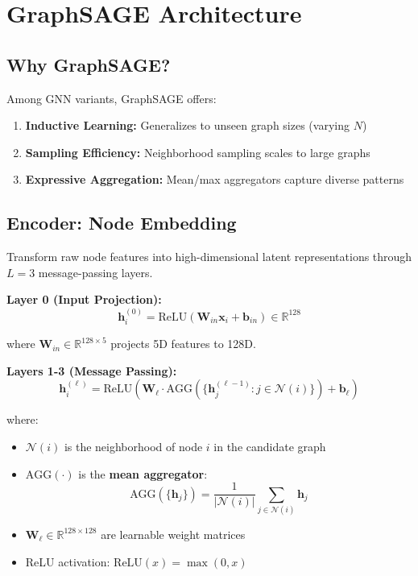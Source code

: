 \section{GraphSAGE Architecture}

\subsection{Why GraphSAGE?}

Among GNN variants, GraphSAGE offers:
\begin{enumerate}
    \item \textbf{Inductive Learning:} Generalizes to unseen graph sizes (varying $N$)
    \item \textbf{Sampling Efficiency:} Neighborhood sampling scales to large graphs
    \item \textbf{Expressive Aggregation:} Mean/max aggregators capture diverse patterns
\end{enumerate}

\subsection{Encoder: Node Embedding}

Transform raw node features into high-dimensional latent representations through $L=3$ message-passing layers.

\textbf{Layer 0 (Input Projection):}
\begin{equation}
\mathbf{h}_i^{(0)} = \text{ReLU}\left( \mathbf{W}_{in} \mathbf{x}_i + \mathbf{b}_{in} \right) \in \mathbb{R}^{128}
\end{equation}

where $\mathbf{W}_{in} \in \mathbb{R}^{128 \times 5}$ projects 5D features to 128D.

\textbf{Layers 1-3 (Message Passing):}
\begin{equation}
\mathbf{h}_i^{(\ell)} = \text{ReLU}\left( \mathbf{W}_{\ell} \cdot \text{AGG}\left( \{\mathbf{h}_j^{(\ell-1)} : j \in \mathcal{N}(i)\} \right) + \mathbf{b}_{\ell} \right)
\end{equation}

where:
\begin{itemize}
    \item $\mathcal{N}(i)$ is the neighborhood of node $i$ in the candidate graph
    \item $\text{AGG}(\cdot)$ is the \textbf{mean aggregator}:
    \begin{equation}
    \text{AGG}(\{\mathbf{h}_j\}) = \frac{1}{|\mathcal{N}(i)|} \sum_{j \in \mathcal{N}(i)} \mathbf{h}_j
    \end{equation}
    \item $\mathbf{W}_{\ell} \in \mathbb{R}^{128 \times 128}$ are learnable weight matrices
    \item ReLU activation: $\text{ReLU}(x) = \max(0, x)$
\end{itemize}

